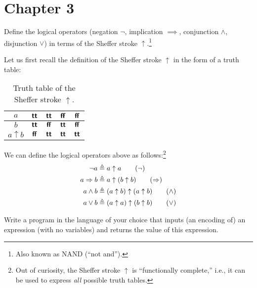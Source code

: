 \newcommand{\sem}[1]
  {\ensuremath{\mathbcal{S}\llbracket#1\rrbracket}}
%
\newcommand{\asem}[1]
  {\ensuremath{\mathbcal{A}\llbracket#1\rrbracket}}
%
\newcommand{\bsem}[1]
  {\ensuremath{\mathbcal{B}\llbracket#1\rrbracket}}
%
\newcommand{\vren}[1]
  {\ensuremath{\iota\llbracket#1\rrbracket}}

\section{Chapter 3}
%
\begin{exercise}{3.6}
  Define the logical operators (negation $\neg$, implication
  $\implies$, conjunction $\wedge$, disjunction $\vee$) in terms of
  the Sheffer stroke $\uparrow$.\footnote{Also known as NAND (``not and'').}
\end{exercise}
%
\begin{answer}
  Let us first recall the definition of the Sheffer stroke $\uparrow$
  in the form of a truth table:
  
  \begin{table}
    \centering
    \caption{Truth table of the Sheffer stroke $\uparrow$.}
    \begin{tabular}{c|c|c|c|c}
      $a$ & $\textbf{\textsf{tt}}$ & $\textbf{\textsf{tt}}$ & $\textbf{\textsf{ff}}$ & $\textbf{\textsf{ff}}$\\\hline
      $b$ & $\textbf{\textsf{tt}}$ & $\textbf{\textsf{ff}}$ & $\textbf{\textsf{tt}}$ & $\textbf{\textsf{ff}}$\\\hline
      $a \uparrow b$ & $\textbf{\textsf{ff}}$ & $\textbf{\textsf{tt}}$ & $\textbf{\textsf{tt}}$ & $\textbf{\textsf{tt}}$
    \end{tabular}
  \end{table}
  
  \noindent We can define the logical operators above as
  follows:\footnote{Out of curiosity, the Sheffer stroke $\uparrow$ is
    ``functionally complete,'' i.e., it can be used to express
    \emph{all} possible truth tables.}
  \begin{align*}
          \neg a &\isDefAs a \uparrow a\tag{$\neg$}\\
    a \implies b &\isDefAs a \uparrow (b \uparrow b)\tag{$\implies$}\\
    a   \wedge b &\isDefAs (a \uparrow b) \uparrow (a \uparrow b)\tag{$\wedge$}\\
    a     \vee b &\isDefAs (a \uparrow a) \uparrow (b \uparrow b)\tag{$\vee$}
  \end{align*}
\end{answer}
%
\begin{exercise}{3.7}
  Write a program in the language of your choice that inputs (an
  encoding of) an expression (with no variables) and returns the value
  of this expression.
\end{exercise}
